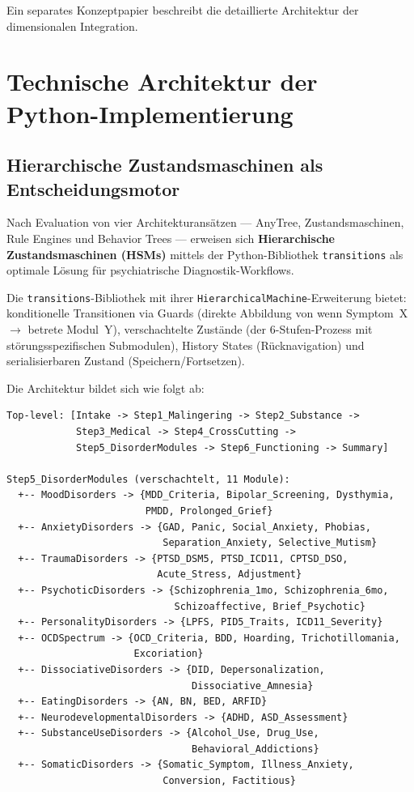 \documentclass[11pt,a4paper]{article}
\begin{document}
Ein separates Konzeptpapier beschreibt die detaillierte Architektur der dimensionalen Integration.


\section{Technische Architektur der Python-Implementierung}
\label{sec:technik}

\subsection{Hierarchische Zustandsmaschinen als Entscheidungsmotor}

Nach Evaluation von vier Architekturans\"atzen --- AnyTree, Zustandsmaschinen, Rule Engines und Behavior Trees --- erweisen sich \textbf{Hierarchische Zustandsmaschinen (HSMs)} mittels der Python-Bibliothek \texttt{transitions} als optimale L\"osung f\"ur psychiatrische Diagnostik-Workflows.

Die \texttt{transitions}-Bibliothek mit ihrer \texttt{HierarchicalMachine}-Erweiterung bietet: konditionelle Transitionen via Guards (direkte Abbildung von \glqq wenn Symptom~X $\to$ betrete Modul~Y\grqq{}), verschachtelte Zust\"ande (der 6-Stufen-Prozess mit st\"orungsspezifischen Submodulen), History States (R\"ucknavigation) und serialisierbaren Zustand (Speichern/Fortsetzen).

Die Architektur bildet sich wie folgt ab:

\begin{verbatim}
Top-level: [Intake -> Step1_Malingering -> Step2_Substance ->
            Step3_Medical -> Step4_CrossCutting ->
            Step5_DisorderModules -> Step6_Functioning -> Summary]

Step5_DisorderModules (verschachtelt, 11 Module):
  +-- MoodDisorders -> {MDD_Criteria, Bipolar_Screening, Dysthymia,
                        PMDD, Prolonged_Grief}
  +-- AnxietyDisorders -> {GAD, Panic, Social_Anxiety, Phobias,
                           Separation_Anxiety, Selective_Mutism}
  +-- TraumaDisorders -> {PTSD_DSM5, PTSD_ICD11, CPTSD_DSO,
                          Acute_Stress, Adjustment}
  +-- PsychoticDisorders -> {Schizophrenia_1mo, Schizophrenia_6mo,
                             Schizoaffective, Brief_Psychotic}
  +-- PersonalityDisorders -> {LPFS, PID5_Traits, ICD11_Severity}
  +-- OCDSpectrum -> {OCD_Criteria, BDD, Hoarding, Trichotillomania,
                      Excoriation}
  +-- DissociativeDisorders -> {DID, Depersonalization,
                                Dissociative_Amnesia}
  +-- EatingDisorders -> {AN, BN, BED, ARFID}
  +-- NeurodevelopmentalDisorders -> {ADHD, ASD_Assessment}
  +-- SubstanceUseDisorders -> {Alcohol_Use, Drug_Use,
                                Behavioral_Addictions}
  +-- SomaticDisorders -> {Somatic_Symptom, Illness_Anxiety,
                           Conversion, Factitious}
\end{verbatim}
\end{document}
